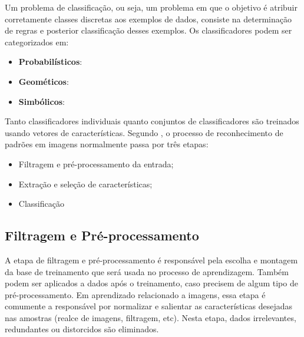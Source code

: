 
Um problema de classificação, ou seja, um problema em que o objetivo é atribuir corretamente classes discretas aos exemplos de dados, consiste na determinação de regras e posterior classificação desses exemplos. Os classificadores podem ser categorizados em:

\begin{itemize}
	\item \textbf{Probabilísticos}:
	\item \textbf{Geométicos}:
	\item \textbf{Simbólicos}:
\end{itemize}





Tanto classificadores individuais quanto conjuntos de classificadores são treinados usando vetores de características. Segundo \cite{jain:1989}, o processo de reconhecimento de padrões em imagens normalmente passa por três etapas: 
\begin{itemize}
    \item Filtragem e pré-processamento da entrada;
    \item Extração e seleção de características;
    \item Classificação
\end{itemize}

\subsection{Filtragem e Pré-processamento}

A etapa de filtragem e pré-processamento é responsável pela escolha e montagem da base de treinamento que será usada no processo de aprendizagem. Também podem ser aplicados a dados após o treinamento, caso precisem de algum tipo de pré-processamento. Em aprendizado relacionado a imagens, essa etapa é comumente a responsável por normalizar e salientar as características desejadas nas amostras (realce de imagens, filtragem, etc). Nesta etapa, dados irrelevantes, redundantes ou distorcidos são eliminados.

